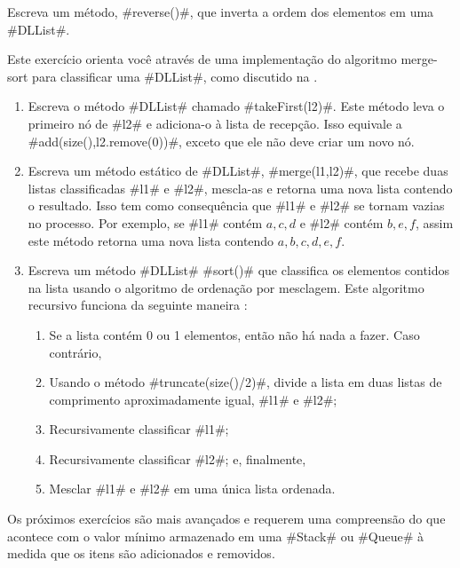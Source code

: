 \begin{exc}
	Escreva um método, #reverse()#, que inverta a ordem dos elementos em
	uma #DLList#.  
\end{exc}

\begin{exc}
	Este exercício orienta você através de uma implementação do algoritmo
	merge-sort para classificar uma #DLList#, como discutido na .
	\begin{enumerate}
		\item Escreva o método #DLList# chamado #takeFirst(l2)#.
		Este método leva o primeiro nó de #l2# e adiciona-o à
		lista de recepção.  Isso equivale a #add(size(),l2.remove(0))#,
		exceto que ele não deve criar um novo nó.
		\item Escreva um método estático de #DLList#, #merge(l1,l2)#, que recebe duas
		listas classificadas #l1# e #l2#, mescla-as e retorna uma nova
		lista contendo o resultado.  Isso tem como consequência que #l1# e #l2# se tornam vazias
		no processo.  Por exemplo, se #l1# contém $a,c,d$ e #l2# contém
		$b,e,f$, assim este método retorna uma nova lista contendo $a,b,c,d,e,f$.
		\item Escreva um método #DLList#  #sort()# que classifica os elementos
		contidos na lista usando o algoritmo de ordenação por mesclagem.
		Este algoritmo recursivo funciona da seguinte maneira :
		\begin{enumerate}
			\item Se a lista contém 0 ou 1 elementos, então
			não há nada a fazer. Caso contrário,
			\item Usando o método #truncate(size()/2)#, divide a lista
			em duas listas de comprimento aproximadamente igual, #l1# e #l2#;
			\item Recursivamente classificar #l1#;
			\item Recursivamente classificar #l2#; e, finalmente,
			\item  Mesclar #l1# e #l2# em uma única lista ordenada.
		\end{enumerate}
	\end{enumerate}
\end{exc}


Os próximos exercícios são mais avançados e requerem uma
compreensão do que acontece com o valor mínimo armazenado em uma #Stack#
ou #Queue#  à medida que os itens são adicionados e removidos.

